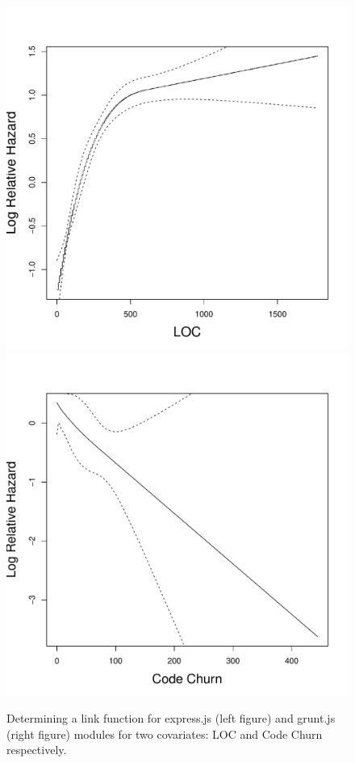 \begin{figure}[t]
\centering
\captionsetup{font=small}
  \includegraphics[width=\linewidth]{pdfs/linkExpress.pdf}
\endminipage
{}
  \includegraphics[width=\linewidth]{pdfs/linkTotalChurnGrunt.pdf}
\endminipage
\caption{Determining a link function for express.js (left figure) and grunt.js (right figure) modules for two covariates: LOC and Code Churn respectively.\vspace{-10pt}}\label{link}
\end{figure}

